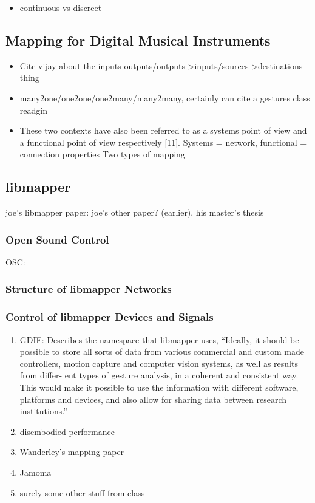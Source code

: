 	\begin{itemize}
		\item continuous vs discreet
	\end{itemize} 

	\subsection{Mapping for Digital Musical Instruments} \label{sec:mappingforDMIs}
		\begin{itemize}
			\item Cite vijay about the inputs-outputs/outputs->inputs/sources->destinations thing
			\item many2one/one2one/one2many/many2many, certainly can cite a gestures class readgin 
			\item These two contexts have also been referred to as a systems point of view and a functional point of view respectively [11].  Systems = network, functional = connection properties Two types of mapping \cite{two_types_of_mapping}
		\end{itemize}
	\subsection{libmapper}
		joe's libmapper paper: 
		joe's other paper? (earlier), his master's thesis
		\subsubsection{Open Sound Control}
		OSC: 
		\subsubsection{Structure of libmapper Networks}
		\subsubsection{Control of libmapper Devices and Signals}
	\begin{enumerate}
		\item GDIF:  Describes the namespace that libmapper uses, ``Ideally, it should be possible to store all sorts of data from various commercial and custom made controllers, motion capture and computer vision systems, as well as results from differ- ent types of gesture analysis, in a coherent and consistent way. This would make it possible to use the information with different software, platforms and devices, and also allow for sharing data between research institutions.'' 
		\item disembodied performance
		\item Wanderley's mapping paper  
		\item Jamoma 
		\item surely some other stuff from class
	\end{enumerate}

